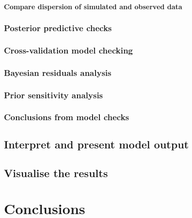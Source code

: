 \documentclass[
]{book}
\begin{document}
\hypertarget{compare-dispersion-of-simulated-and-observed-data}{%
\paragraph{Compare dispersion of simulated and observed
data}\label{compare-dispersion-of-simulated-and-observed-data}}

\hypertarget{pois-ppc}{%
\subsubsection{Posterior predictive checks}\label{pois-ppc}}

\hypertarget{pois-cv}{%
\subsubsection{Cross-validation model checking}\label{pois-cv}}

\hypertarget{pois-resids}{%
\subsubsection{Bayesian residuals analysis}\label{pois-resids}}

\hypertarget{pois-sens}{%
\subsubsection{Prior sensitivity analysis}\label{pois-sens}}

\hypertarget{conclusions-from-model-checks-1}{%
\subsubsection{Conclusions from model
checks}\label{conclusions-from-model-checks-1}}

\hypertarget{pois-present}{%
\subsection{Interpret and present model output}\label{pois-present}}

\hypertarget{visualise-the-results-1}{%
\subsection{Visualise the results}\label{visualise-the-results-1}}

\hypertarget{conclusions-2}{%
\section{Conclusions}\label{conclusions-2}}
\end{document}
